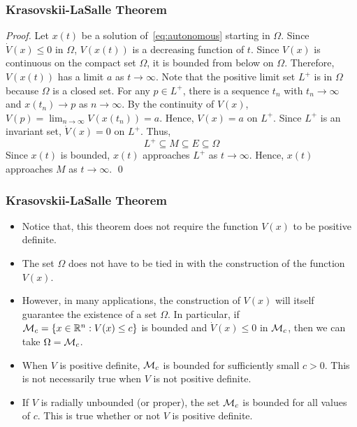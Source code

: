 \begin{frame}
    \frametitle{Krasovskii-LaSalle Theorem}

    \begin{proof}
        Let $x(t)$ be a solution of~\eqref{eq:autonomous} starting in $\Omega$.
        Since $\dot{V}(x) \leq 0$ in $\Omega$, $V(x(t))$ is a decreasing
        function of $t$. Since $V(x)$ is continuous on the compact set $\Omega$,
        it is bounded from below on $\Omega$. Therefore, $V(x(t))$ has a limit
        $a$ as $t \to \infty$. Note that the positive limit set $L^+$ is in
        $\Omega$ because $\Omega$ is a closed set. For any $p \in L^+$, there is
        a sequence $t_n$ with $t_n \to \infty$ and $x(t_n) \to p$ as $n \to
        \infty$. By the continuity of $V(x)$, $V(p) = \lim_{n \to \infty}
        V(x(t_n)) = a$. Hence, $V(x) = a$ on $L^+$. Since $L^+$ is an invariant
        set, $\dot{V}(x) = 0$ on $L^+$. Thus, \[ L^+ \subseteq M \subseteq E
        \subseteq \Omega \] Since $x(t)$ is bounded, $x(t)$ approaches $L^+$ as 
        $t \to \infty$. Hence, $x(t)$ approaches $M$ as $t \to \infty$. \hfill 
        \qed
    \end{proof}
\end{frame}

\begin{frame}
    \frametitle{Krasovskii-LaSalle Theorem}

    \begin{itemize}
        \item Notice that, this theorem does not require the function $V(x)$ to 
        be positive definite.
        \item The set $\Omega$ does not have to be tied in with the construction
        of the function $V(x)$.
        \item However, in many applications, the construction of $V(x)$ will
        itself guarantee the existence of a set $\Omega$. In particular, if
        $\mathcal{M}_c = \{x \in \mathbb{R}^n: V(x) \leq c\}$ is bounded and
        $\dot{V}(x) \leq 0$ in $\mathcal{M}_c$, then we can take $\Omega = \mathcal{M}_c$.
        \item When $V$ is positive definite, $\mathcal{M}_c$ is bounded for
        sufficiently small $c > 0$. This is not necessarily true when $V$ is not
        positive definite.
        \item If $V$ is radially unbounded (or proper), the set $\mathcal{M}_c$ is
        bounded for all values of $c$. This is true whether or not $V$ is
        positive definite.
    \end{itemize}
\end{frame}

